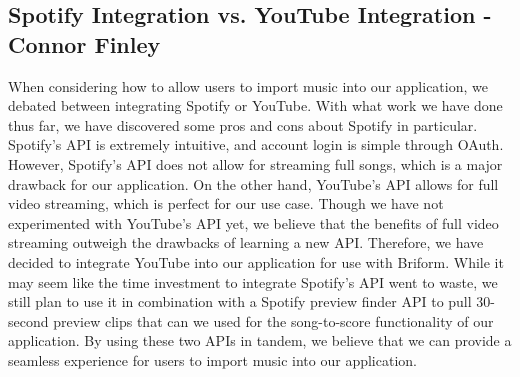 \documentclass[12pt, letterpaper]{article}
\begin{document}
\subsection*{Spotify Integration vs. YouTube Integration - Connor Finley}
When considering how to allow users to import music into our application, we debated between integrating Spotify or YouTube.  With what work we have done thus far, we have discovered some pros and cons about Spotify in particular.  Spotify's API is extremely intuitive, and account login is simple through OAuth.  However, Spotify's API does not allow for streaming full songs, which is a major drawback for our application.  On the other hand, YouTube's API allows for full video streaming, which is perfect for our use case.  Though we have not experimented with YouTube's API yet, we believe that the benefits of full video streaming outweigh the drawbacks of learning a new API.  Therefore, we have decided to integrate YouTube into our application for use with Briform.  While it may seem like the time investment to integrate Spotify's API went to waste, we still plan to use it in combination with a Spotify preview finder API to pull 30-second preview clips that can we used for the song-to-score functionality of our application.  By using these two APIs in tandem, we believe that we can provide a seamless experience for users to import music into our application.
\end{document}
